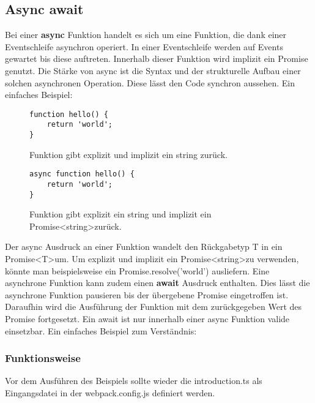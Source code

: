 \subsection{Async await}
Bei einer \textbf{async} Funktion handelt es sich um eine Funktion, die dank einer Eventschleife asynchron operiert. In einer Eventschleife werden auf Events gewartet bis diese auftreten. Innerhalb dieser Funktion wird implizit ein Promise genutzt. Die Stärke von async ist die Syntax und der strukturelle Aufbau einer solchen asynchronen Operation. Diese lässt den Code synchron aussehen.\cite{async-await} Ein einfaches Beispiel:

\begin{figure}[H]
\begin{lstlisting}[basicstyle=\small]
function hello() {
    return 'world';
}
\end{lstlisting}
\caption{Funktion gibt explizit und implizit ein string zurück.}
\end{figure}

\begin{figure}[H]
\begin{lstlisting}[basicstyle=\small]
async function hello() {
    return 'world';
}
\end{lstlisting}
\caption{Funktion gibt explizit ein string und implizit ein Promise\textless string\textgreater zurück.}
\end{figure}

\noindent
Der async Ausdruck an einer Funktion wandelt den Rückgabetyp T in ein Promise\textless T\textgreater um. Um explizit und implizit ein Promise\textless string\textgreater zu verwenden, könnte man beispielsweise ein Promise.resolve('world') ausliefern. Eine asynchrone Funktion kann zudem einen \textbf{await} Ausdruck enthalten. Dies lässt die asynchrone Funktion pausieren bis der übergebene Promise eingetroffen ist. Daraufhin wird die Ausführung der Funktion mit dem zurückgegeben Wert des Promise fortgesetzt. Ein await ist nur innerhalb einer async Funktion valide einsetzbar. Ein einfaches Beispiel zum Verständnis:\\

\subsubsection{Funktionsweise}

\noindent
Vor dem Ausführen des Beispiels sollte wieder die introduction.ts als Eingangsdatei in der webpack.config.js definiert werden.

